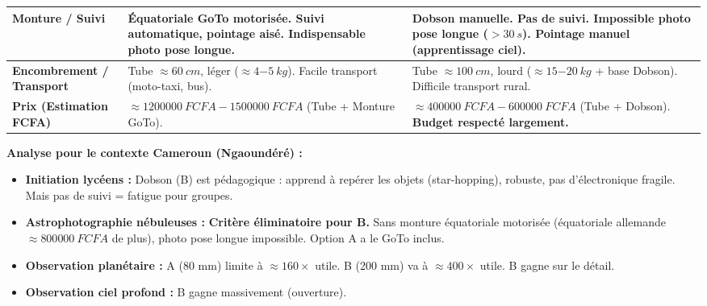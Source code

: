 \documentclass[11pt]{article}
\begin{document}
\begin{exoresolu}
\begin{center}
\begin{tabularx}{\linewidth}{|l|X|X|}
\textbf{Monture / Suivi} & \textbf{Équatoriale GoTo motorisée.} Suivi automatique, pointage aisé. Indispensable photo pose longue. & Dobson manuelle. \textbf{Pas de suivi.} Impossible photo pose longue ($> \SI{30}{s}$). Pointage manuel (apprentissage ciel). \\ \hline
\textbf{Encombrement / Transport} & Tube $\approx \SI{60}{cm}$, léger ($\approx \SI{4-5}{kg}$). Facile transport (moto-taxi, bus). & Tube $\approx \SI{100}{cm}$, lourd ($\approx \SI{15-20}{kg}$ + base Dobson). Difficile transport rural. \\ \hline
\textbf{Prix (Estimation FCFA)} & $\approx \SI{1 200 000}{FCFA} - \SI{1 500 000}{FCFA}$ (Tube + Monture GoTo). & $\approx \SI{400 000}{FCFA} - \SI{600 000}{FCFA}$ (Tube + Dobson). \textbf{Budget respecté largement.} \\ \hline
\end{tabularx}
\end{center}

\textbf{Analyse pour le contexte Cameroun (Ngaoundéré) :}
\begin{itemize}
    \item \textbf{Initiation lycéens :} Dobson (B) est pédagogique : apprend à repérer les objets (star-hopping), robuste, pas d'électronique fragile. Mais pas de suivi = fatigue pour groupes.
    \item \textbf{Astrophotographie nébuleuses :} \textbf{Critère éliminatoire pour B.} Sans monture équatoriale motorisée (équatoriale allemande $\approx \SI{800 000}{FCFA}$ de plus), photo pose longue impossible. Option A a le GoTo inclus.
    \item \textbf{Observation planétaire :} A (80 mm) limite à $\approx 160\times$ utile. B (200 mm) va à $\approx 400\times$ utile. B gagne sur le détail.
    \item \textbf{Observation ciel profond :} B gagne massivement (ouverture).
\end{itemize}


\end{exoresolu}
\end{document}
